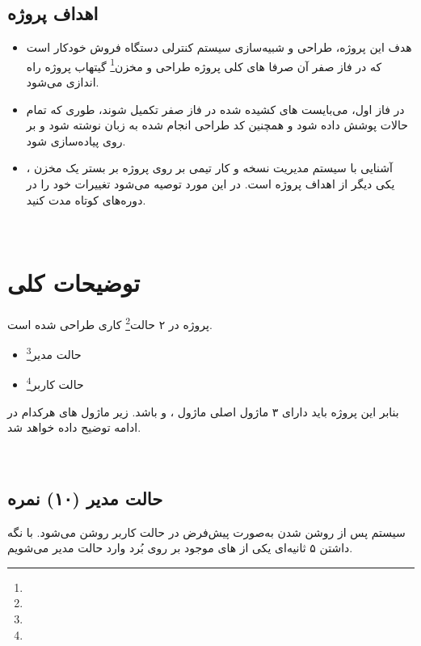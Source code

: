 \documentclass[]{article}
\begin{document}
\subsection*{{\titr اهداف پروژه}}
\begin{itemize}
	\item
	هدف این پروژه، طراحی و شبیه‌سازی سیستم کنترلی دستگاه فروش خودکار است که در فاز صفر آن صرفا  های کلی پروژه طراحی و مخزن\footnote{} گیتهاب پروژه راه اندازی می‌شود. 
	
	\item 
	در فاز اول، می‌بایست  های کشیده شده در فاز صفر تکمیل شوند، طوری که تمام حالات پوشش داده شود و همچنین کد طراحی انجام شده به زبان  نوشته شود و بر روی  پیاده‌سازی شود.
	\item 
	آشنایی با سیستم مدیریت نسخه  و کار تیمی بر روی پروژه بر بستر یک مخزن ، یکی دیگر از اهداف پروژه است. در این مورد توصیه می‌شود تغییرات خود را در دوره‌های کوتاه مدت  کنید.
\end{itemize}



 \Large \textbf{\\
}


\section*{{\titr توضیحات کلی }}

پروژه در ۲ حالت\footnote{} کاری طراحی شده است.
\begin{itemize}
	\item حالت مدیر\footnote{}
	\item حالت کاربر\footnote{}
\end{itemize}

بنابر این پروژه باید دارای ۳ ماژول اصلی ماژول ،  و   باشد. زیر ماژول های هرکدام در ادامه توضیح داده خواهد شد.





\newpage
\Large \textbf{\\
}

\subsection*{{\titr حالت مدیر} (۱۰) نمره} 
سیستم پس از روشن شدن به‌صورت پیش‌فرض در حالت کاربر روشن می‌شود. با نگه داشتن ۵ ثانیه‌ای یکی از  های موجود بر روی بُرد وارد حالت مدیر می‌شویم.
\end{document}
